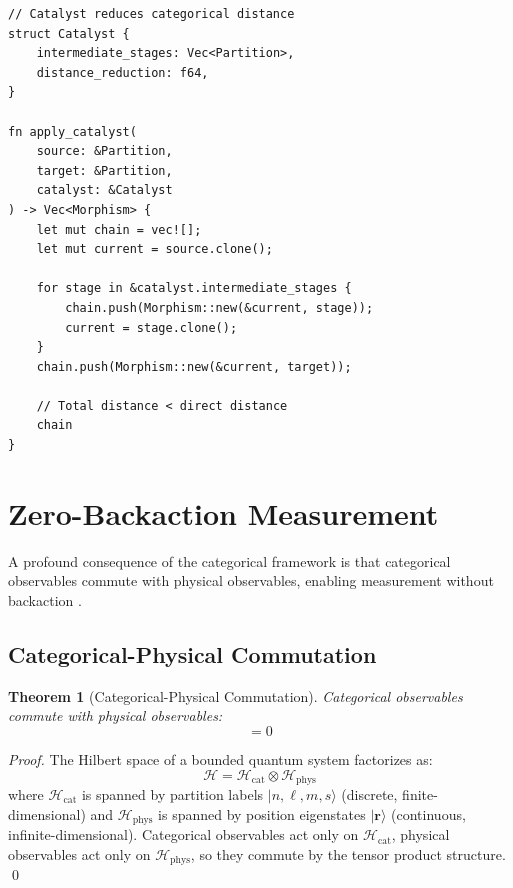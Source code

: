 \documentclass[twocolumn,10pt]{article}
\newtheorem{theorem}{Theorem}[section]
\theoremstyle{remark}
\begin{document}
\begin{lstlisting}
// Catalyst reduces categorical distance
struct Catalyst {
    intermediate_stages: Vec<Partition>,
    distance_reduction: f64,
}

fn apply_catalyst(
    source: &Partition,
    target: &Partition,
    catalyst: &Catalyst
) -> Vec<Morphism> {
    let mut chain = vec![];
    let mut current = source.clone();

    for stage in &catalyst.intermediate_stages {
        chain.push(Morphism::new(&current, stage));
        current = stage.clone();
    }
    chain.push(Morphism::new(&current, target));

    // Total distance < direct distance
    chain
}
\end{lstlisting}

\section{Zero-Backaction Measurement}
\label{sec:zerobackaction}

A profound consequence of the categorical framework is that categorical observables commute with physical observables, enabling measurement without backaction \cite{sachikonye2024zerobackaction}.

\subsection{Categorical-Physical Commutation}

\begin{theorem}[Categorical-Physical Commutation]
\label{thm:commutation}
Categorical observables commute with physical observables:
\begin{equation}
[\hat{O}_{\text{cat}}, \hat{O}_{\text{phys}}] = 0
\end{equation}
\end{theorem}

\begin{proof}
The Hilbert space of a bounded quantum system factorizes as:
\begin{equation}
\mathcal{H} = \mathcal{H}_{\text{cat}} \otimes \mathcal{H}_{\text{phys}}
\end{equation}
where $\mathcal{H}_{\text{cat}}$ is spanned by partition labels $|n, \ell, m, s\rangle$ (discrete, finite-dimensional) and $\mathcal{H}_{\text{phys}}$ is spanned by position eigenstates $|\mathbf{r}\rangle$ (continuous, infinite-dimensional). Categorical observables act only on $\mathcal{H}_{\text{cat}}$, physical observables act only on $\mathcal{H}_{\text{phys}}$, so they commute by the tensor product structure. \qed
\end{proof}
\end{document}
